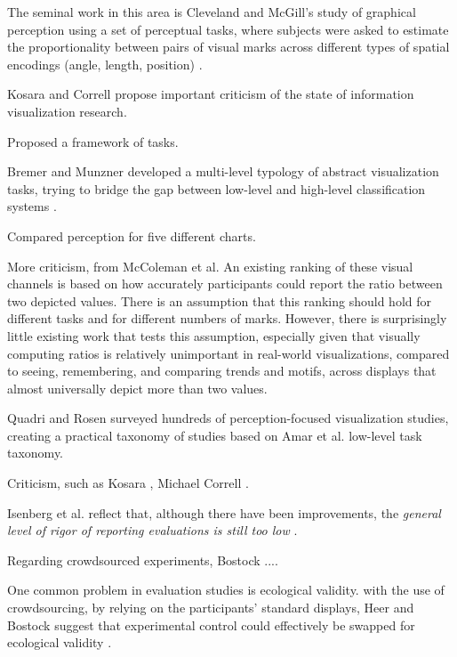 \documentclass[manuscript, screen]{timtm}
\begin{document}
The seminal work in this area is Cleveland and McGill's study of graphical perception using a set of perceptual tasks, where subjects were asked to estimate the proportionality between pairs of visual marks across different types of spatial encodings (angle, length, position)  \cite{ClevelandWilliamS.1984GPTE}.

Kosara and Correll propose important criticism of the state of information visualization research.

Proposed a framework of tasks.

Bremer and Munzner developed a multi-level typology of abstract visualization tasks, trying to bridge the gap between low-level and high-level classification systems \cite{BrehmerMatthew2013AMTo}.

Compared perception for five different charts.

More criticism, from McColeman et al. \cite{McColemanCaitlynM.2022RtRo-rethinking-visual-channels}
An existing ranking of these
visual channels is based on how accurately participants could report the ratio between two depicted values. There is an assumption
that this ranking should hold for different tasks and for different numbers of marks. However, there is surprisingly little existing work that
tests this assumption, especially given that visually computing ratios is relatively unimportant in real-world visualizations, compared
to seeing, remembering, and comparing trends and motifs, across displays that almost universally depict more than two values.

Quadri and Rosen surveyed hundreds of perception-focused visualization studies, creating a practical taxonomy of studies based on Amar et al. low-level task taxonomy.

Criticism, such as Kosara \cite{kosara2016empire}, Michael Correll \cite{CorrellProgressVis}.

Isenberg et al. reflect that, although there have been improvements, the \textit{general level of rigor of reporting evaluations is still too low} \cite{IsenbergTobias2013ASRo}.

Regarding crowdsourced experiments, Bostock ...\cite{HeerJeffrey2010Cgpu-bostock-amazon-turk}.

One common problem in evaluation studies is ecological validity. with the use of crowdsourcing, by relying on the participants' standard displays, Heer and Bostock suggest that experimental control could effectively be swapped for ecological validity \cite{HeerJeffrey2010Cgpu-bostock-amazon-turk}.
\end{document}
